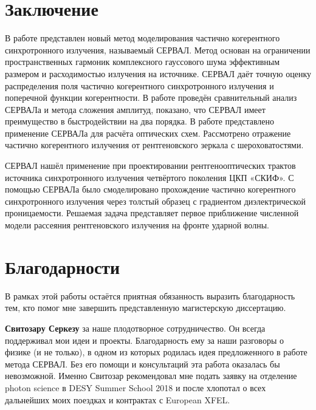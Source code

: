 \chapter*{Заключение}						%


В работе представлен новый метод моделирования частично когерентного синхротронного излучения, называемый СЕРВАЛ. Метод основан на ограничении пространственных гармоник комплексного гауссового шума эффективным размером и расходимостью излучения на источнике. СЕРВАЛ даёт точную оценку распределения поля частично когерентного синхротронного излучения и поперечной функции когерентности. В работе проведён сравнительный анализ СЕРВАЛа и метода сложения амплитуд, показано, что СЕРВАЛ имеет преимущество в быстродействии на два порядка. В работе представлено применение СЕРВАЛа для расчёта оптических схем. Рассмотрено отражение частично когерентного излучения от рентгеновского зеркала с шероховатостями. 

СЕРВАЛ нашёл применение при проектировании рентгенооптических трактов источника синхротронного излучения четвёртого поколения ЦКП «СКИФ». С помощью СЕРВАЛа было смоделировано прохождение частично когерентного синхротронного излучения через толстый образец с градиентом диэлектрической проницаемости. Решаемая задача представляет первое приближение численной модели рассеяния рентгеновского излучения на фронте ударной волны. 
\newpage
%
\chapter*{Благодарности}						%
В рамках этой работы остаётся приятная обязанность выразить благодарность тем, кто помог мне завершить представленную магистерскую диссертацию. 

\textbf{Свитозару Серкезу} за наше плодотворное сотрудничество. Он всегда поддерживал мои идеи и проекты. Благодарность ему за наши разговоры о физике (и не только), в одном из которых родилась идея предложенного в работе метода СЕРВАЛ. Без его помощи и консультаций эта работа оказалась бы невозможной. Именно Свитозар рекомендовал мне подать заявку на отделение photon science в DESY Summer School 2018 и после хлопотал о всех дальнейших моих поездках и контрактах с European XFEL.

